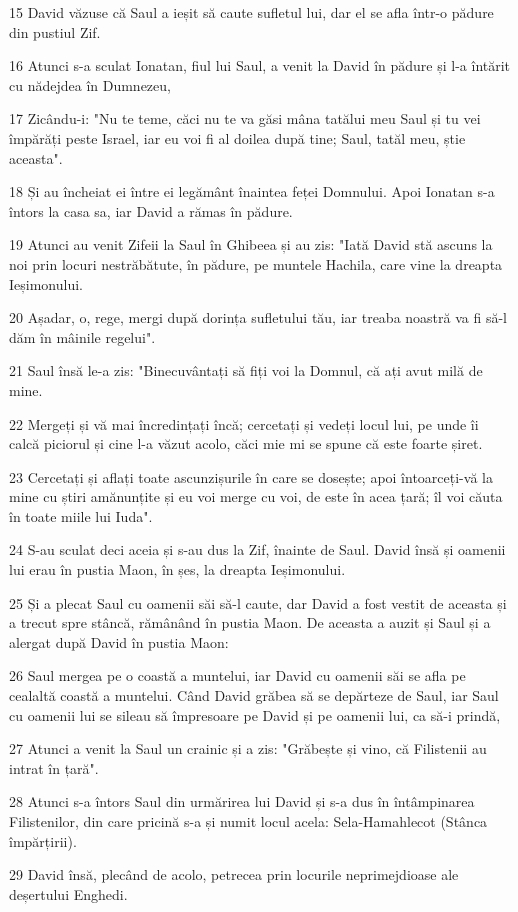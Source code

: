 \par 15 David văzuse că Saul a ieșit să caute sufletul lui, dar el se afla într-o pădure din pustiul Zif.
\par 16 Atunci s-a sculat Ionatan, fiul lui Saul, a venit la David în pădure și l-a întărit cu nădejdea în Dumnezeu,
\par 17 Zicându-i: "Nu te teme, căci nu te va găsi mâna tatălui meu Saul și tu vei împărăți peste Israel, iar eu voi fi al doilea după tine; Saul, tatăl meu, știe aceasta".
\par 18 Și au încheiat ei între ei legământ înaintea feței Domnului. Apoi Ionatan s-a întors la casa sa, iar David a rămas în pădure.
\par 19 Atunci au venit Zifeii la Saul în Ghibeea și au zis: "Iată David stă ascuns la noi prin locuri nestrăbătute, în pădure, pe muntele Hachila, care vine la dreapta Ieșimonului.
\par 20 Așadar, o, rege, mergi după dorința sufletului tău, iar treaba noastră va fi să-l dăm în mâinile regelui".
\par 21 Saul însă le-a zis: "Binecuvântați să fiți voi la Domnul, că ați avut milă de mine.
\par 22 Mergeți și vă mai încredințați încă; cercetați și vedeți locul lui, pe unde îi calcă piciorul și cine l-a văzut acolo, căci mie mi se spune că este foarte șiret.
\par 23 Cercetați și aflați toate ascunzișurile în care se dosește; apoi întoarceți-vă la mine cu știri amănunțite și eu voi merge cu voi, de este în acea țară; îl voi căuta în toate miile lui Iuda".
\par 24 S-au sculat deci aceia și s-au dus la Zif, înainte de Saul. David însă și oamenii lui erau în pustia Maon, în șes, la dreapta Ieșimonului.
\par 25 Și a plecat Saul cu oamenii săi să-l caute, dar David a fost vestit de aceasta și a trecut spre stâncă, rămânând în pustia Maon. De aceasta a auzit și Saul și a alergat după David în pustia Maon:
\par 26 Saul mergea pe o coastă a muntelui, iar David cu oamenii săi se afla pe cealaltă coastă a muntelui. Când David grăbea să se depărteze de Saul, iar Saul cu oamenii lui se sileau să împresoare pe David și pe oamenii lui, ca să-i prindă,
\par 27 Atunci a venit la Saul un crainic și a zis: "Grăbește și vino, că Filistenii au intrat în țară".
\par 28 Atunci s-a întors Saul din urmărirea lui David și s-a dus în întâmpinarea Filistenilor, din care pricină s-a și numit locul acela: Sela-Hamahlecot (Stânca împărțirii).
\par 29 David însă, plecând de acolo, petrecea prin locurile neprimejdioase ale deșertului Enghedi.


